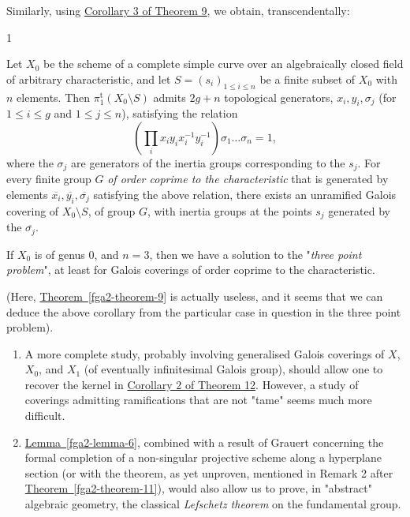   Similarly, using \hyperref[fga2-theorem-9-corollary-3]{Corollary 3 of Theorem 9}, we obtain, transcendentally:\begin{corollary}{1}\label{fga2-theorem-14-corollary-1}\skipsinglepar\par{}Let \(X_0\) be the scheme of a complete simple curve over an algebraically closed field of arbitrary characteristic, and let \(S=(s_i)_{1\leqslant  i\leqslant  n}\) be a finite subset of \(X_0\) with \(n\) elements.
    Then \(\pi _1^\mathrm {t}(X_0\setminus  S)\) admits \(2g+n\) topological generators, \(x_i,y_i,\sigma _j\) (for \(1\leqslant  i\leqslant  g\) and \(1\leqslant  j\leqslant  n\)), satisfying the relation
    \[       \left (\prod _i x_iy_ix_i^{-1}y_i^{-1}\right )\sigma _1\ldots \sigma _n = 1,     \]
    where the \(\sigma _j\) are generators of the inertia groups corresponding to the \(s_j\).
    For every finite group \(G\) \emph{of order coprime to the characteristic} that is generated by elements \(\overline {x_i},\overline {y_i},\overline {\sigma _j}\) satisfying the above relation, there exists an unramified Galois covering of \(X_0\setminus  S\), of group \(G\), with inertia groups at the points \(s_j\) generated by the \(\overline {\sigma _j}\).\end{corollary}\par{}If \(X_0\) is of genus \(0\), and \(n=3\), then we have a solution to the "\emph{three point problem}", at least for Galois coverings of order coprime to the characteristic.
  
  (Here, \hyperref[fga2-theorem-9]{Theorem~\ref*{fga2-theorem-9}} is actually useless, and it seems that we can deduce the above corollary from the particular case in question in the three point problem).\begin{remarks}{}\label{fga2-8-remarks-ii}\skipsinglepar\begin{enumerate}\item{}A more complete study, probably involving generalised Galois coverings of \(X\), \(X_0\), and \(X_1\) (of eventually infinitesimal Galois group), should allow one to recover the kernel in \hyperref[fga2-theorem-12-corollary-2]{Corollary 2 of Theorem 12}.
      However, a study of coverings admitting ramifications that are not "tame" seems much more difficult.

    \item{}\hyperref[fga2-lemma-6]{Lemma~\ref*{fga2-lemma-6}}, combined with a result of Grauert concerning the formal completion of a non-singular projective scheme along a hyperplane section (or with the theorem, as yet unproven, mentioned in Remark 2 after \hyperref[fga2-theorem-11]{Theorem~\ref*{fga2-theorem-11}}), would also allow us to prove, in "abstract" algebraic geometry, the classical \emph{Lefschetz theorem} on the fundamental group.\end{enumerate}\end{remarks}